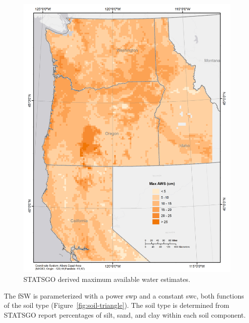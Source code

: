 \documentclass[preprint,12pt]{elsarticle}
\begin{document}
\begin{figure}
  \centering
\includegraphics[width=1\linewidth]{maxaws}
  \caption{\ac{STATSGO} derived maximum available water estimates. }
  \label{fig:aws}
\end{figure}

The \ac{fSW} is parameterized with a power \acs{swp} and a constant
\acs{swc}, both functions of the soil type
(Figure~\ref{fig:soil-triangle}).  The soil type is determined from
\ac{STATSGO} report percentages of silt, sand, and clay within each
soil component.

\end{document}
